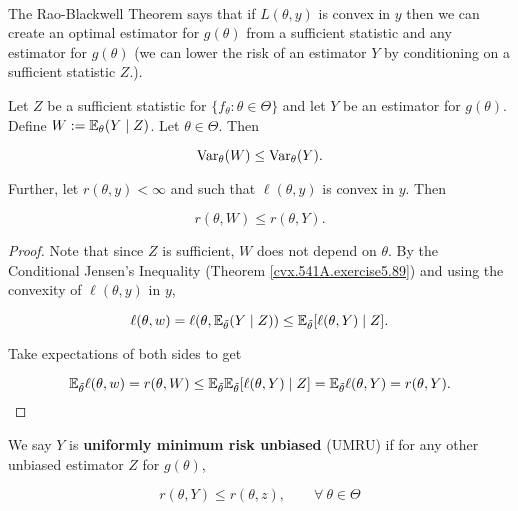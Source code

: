 \

The Rao-Blackwell Theorem says that if \(L(\theta, y)\) is convex in \(y\) then we can create an optimal estimator for \(g(\theta)\) from a sufficient statistic and any estimator for \(g(\theta)\) (we can lower the risk of an estimator \(Y\) by conditioning on a sufficient statistic \(Z\).).

\begin{theorem} Let \(Z\) be a sufficient statistic for \(\{f_\theta:\theta \in \Theta\}\) and let \(Y\) be an estimator for \(g(\theta)\). Define \(W:= \E_\theta(Y \mid Z)\). Let \(\theta \in \Theta\). Then



\[
\Var_\theta(W) \leq \Var_\theta (Y).
\]

Further, let \(r(\theta, y) < \infty\) and such that \(\ell(\theta, y)\) is convex in \(y\). Then

\[
r(\theta, W) \leq r(\theta, Y).
\]

\end{theorem}

\begin{proof} Note that since \(Z\) is sufficient, \(W\) does not depend on \(\theta\). By the Conditional Jensen's Inequality (Theorem \ref{cvx.541A.exercise5.89}) and using the convexity of \(\ell(\theta, y)\) in \(y\),

\[
\ell(\theta, w) = \ell(\theta, \E_{\tilde{\theta}}(Y \mid Z)) \leq \E_{\tilde{\theta}} [ \ell(\theta, Y) \mid Z].
\]

Take expectations of both sides to get

\[
\E_{\tilde{\theta}} \ell(\theta, w) =  r(\theta, W)  \leq \E_{\tilde{\theta}} \E_{\tilde{\theta}} [ \ell(\theta, Y) \mid Z] = \E_{\tilde{\theta}} \ell(\theta, Y) = r(\theta, Y).
\]

\end{proof}

\begin{definition}We say \(Y\) is \textbf{uniformly minimum risk unbiased} (UMRU) if for any other unbiased estimator \(Z\) for \(g(\theta)\),

\[
r(\theta, Y) \leq r(\theta, z), \qquad \forall \ \theta \in \Theta
\]

\end{definition}

